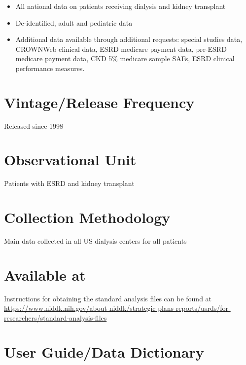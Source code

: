 \documentclass[
]{book}
\providecommand{\tightlist}{%
  \setlength{\itemsep}{0pt}\setlength{\parskip}{0pt}}
\begin{document}
\begin{itemize}
\tightlist
\item
  All national data on patients receiving dialysis and kidney transplant
\item
  De-identified, adult and pediatric data
\item
  Additional data available through additional requests: special studies data, CROWNWeb clinical data, ESRD medicare payment data, pre-ESRD medicare payment data, CKD 5\% medicare sample SAFs, ESRD clinical performance measures.
\end{itemize}

\hypertarget{vintagerelease-frequency-92}{%
\section{Vintage/Release Frequency}\label{vintagerelease-frequency-92}}

Released since 1998

\hypertarget{observational-unit-92}{%
\section{Observational Unit}\label{observational-unit-92}}

Patients with ESRD and kidney transplant

\hypertarget{collection-methodology-92}{%
\section{Collection Methodology}\label{collection-methodology-92}}

Main data collected in all US dialysis centers for all patients

\hypertarget{available-at-92}{%
\section{Available at}\label{available-at-92}}

Instructions for obtaining the standard analysis files can be found at \url{https://www.niddk.nih.gov/about-niddk/strategic-plans-reports/usrds/for-researchers/standard-analysis-files}

\hypertarget{user-guidedata-dictionary-92}{%
\section{User Guide/Data Dictionary}\label{user-guidedata-dictionary-92}}
\end{document}
